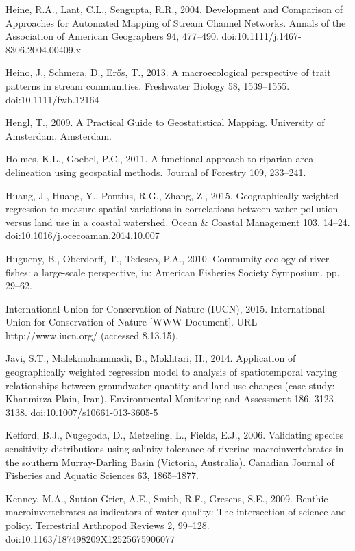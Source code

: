 \begin{thebibliography}
\bibitem{} \hangindent=1cm Heine, R.A., Lant, C.L., Sengupta, R.R., 2004. Development and Comparison of Approaches for Automated Mapping of Stream Channel Networks. Annals of the Association of American Geographers 94, 477–490. doi:10.1111/j.1467-8306.2004.00409.x

\bibitem{} \hangindent=1cm Heino, J., Schmera, D., Erős, T., 2013. A macroecological perspective of trait patterns in stream communities. Freshwater Biology 58, 1539–1555. doi:10.1111/fwb.12164

\bibitem{} \hangindent=1cm Hengl, T., 2009. A Practical Guide to Geostatistical Mapping. University of Amsterdam, Amsterdam.

\bibitem{} \hangindent=1cm Holmes, K.L., Goebel, P.C., 2011. A functional approach to riparian area delineation using geospatial methods. Journal of Forestry 109, 233–241.

\bibitem{} \hangindent=1cm Huang, J., Huang, Y., Pontius, R.G., Zhang, Z., 2015. Geographically weighted regression to measure spatial variations in correlations between water pollution versus land use in a coastal watershed. Ocean & Coastal Management 103, 14–24. doi:10.1016/j.ocecoaman.2014.10.007

\bibitem{} \hangindent=1cm Hugueny, B., Oberdorff, T., Tedesco, P.A., 2010. Community ecology of river fishes: a large-scale perspective, in: American Fisheries Society Symposium. pp. 29–62.

\bibitem{} \hangindent=1cm International Union for Conservation of Nature (IUCN), 2015. International Union for Conservation of Nature [WWW Document]. URL http://www.iucn.org/ (accessed 8.13.15).

\bibitem{} \hangindent=1cm Javi, S.T., Malekmohammadi, B., Mokhtari, H., 2014. Application of geographically weighted regression model to analysis of spatiotemporal varying relationships between groundwater quantity and land use changes (case study: Khanmirza Plain, Iran). Environmental Monitoring and Assessment 186, 3123–3138. doi:10.1007/s10661-013-3605-5

\bibitem{} \hangindent=1cm Kefford, B.J., Nugegoda, D., Metzeling, L., Fields, E.J., 2006. Validating species sensitivity distributions using salinity tolerance of riverine macroinvertebrates in the southern Murray-Darling Basin (Victoria, Australia). Canadian Journal of Fisheries and Aquatic Sciences 63, 1865–1877.

\bibitem{} \hangindent=1cm Kenney, M.A., Sutton-Grier, A.E., Smith, R.F., Gresens, S.E., 2009. Benthic macroinvertebrates as indicators of water quality: The intersection of science and policy. Terrestrial Arthropod Reviews 2, 99–128. doi:10.1163/187498209X12525675906077


\end{thebibliography}

